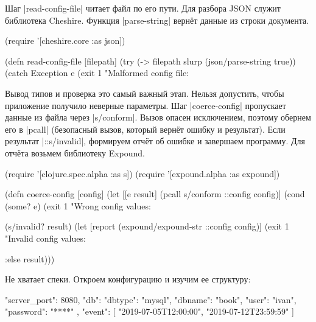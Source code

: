 Шаг \spverb|read-config-file| читает файл по его пути. Для разбора JSON служит
библиотека Cheshire. Функция \spverb|parse-string| верн\"{е}т данные из
строки документа.

\begin{english}
  \begin{clojure}
(require '[cheshire.core :as json])

(defn read-config-file
  [filepath]
  (try
    (-> filepath slurp (json/parse-string true))
    (catch Exception e
      (exit 1 "Malformed config file: %
  \end{clojure}
\end{english}

Вывод типов и проверка это самый важный этап. Нельзя допустить, чтобы приложение
получило неверные параметры. Шаг \spverb|coerce-config| пропускает данные из
файла через \spverb|s/conform|. Вызов опасен исключением, поэтому обернем его в
\spverb|pcall| (безопасный вызов, который верн\"{е}т ошибку и результат). Если
результат \spverb|::s/invalid|, формируем отч\"{е}т об ошибке и завершаем
программу. Для отч\"{е}та возьмем библиотеку Expound.

\begin{english}
  \begin{clojure}
(require '[clojure.spec.alpha :as s])
(require '[expound.alpha :as expound])

(defn coerce-config [config]
  (let [[e result] (pcall s/conform ::config config)]
    (cond
      (some? e)
      (exit 1 "Wrong config values: %

      (s/invalid? result)
      (let [report (expound/expound-str ::config config)]
        (exit 1 "Invalid config values: %

      :else result)))
  \end{clojure}
\end{english}

Не хватает спеки. Откроем конфигурацию и изучим ее структуру:

\begin{english}
  \begin{json}
{
    "server_port": 8080,
    "db": {
        "dbtype":   "mysql",
        "dbname":   "book",
        "user":     "ivan",
        "password": "****"
    },
    "event": [
        "2019-07-05T12:00:00",
        "2019-07-12T23:59:59"
    ]
}
  \end{json}
\end{english}

